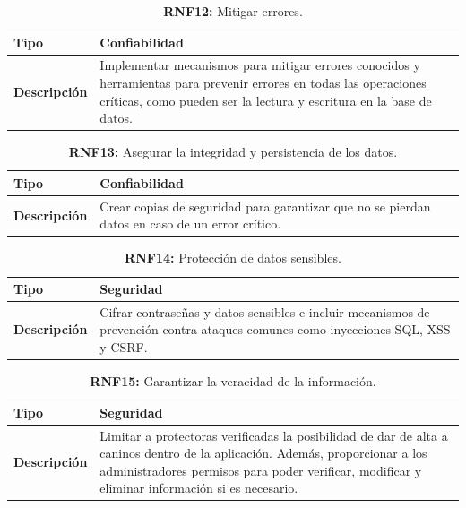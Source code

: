 \documentclass[a4paper, 12pt]{article}
\begin{document}
\begin{table}[H]
\captionsetup{list=no}%
\captionsetup{justification=raggedright,singlelinecheck=false}
\captionsetup{labelformat=empty}
\caption*{\textbf{RNF12:} Mitigar errores.}
\label{tab:RNF12}
    \begin{tabular}{|m{5cm}|m{10cm}|}
	    \hline
	    \textbf{Tipo} & Confiabilidad \\ 
	    \hline
	    \textbf{Descripción} & Implementar mecanismos para mitigar errores conocidos y herramientas para prevenir errores en todas las operaciones críticas, como pueden ser la lectura y escritura en la base de datos. \\ 
	    \hline
    \end{tabular}
\end{table}

\begin{table}[H]
\captionsetup{list=no}%
\captionsetup{justification=raggedright,singlelinecheck=false}
\captionsetup{labelformat=empty}
\caption*{\textbf{RNF13:} Asegurar la integridad y persistencia de los datos.}
\label{tab:RNF13}
    \begin{tabular}{|m{5cm}|m{10cm}|}
	    \hline
	    \textbf{Tipo} & Confiabilidad \\ 
	    \hline
	    \textbf{Descripción} & Crear copias de seguridad para garantizar que no se pierdan datos en caso de un error crítico. \\ 
	    \hline
    \end{tabular}
\end{table}


\begin{table}[H]
\captionsetup{list=no}%
\captionsetup{justification=raggedright,singlelinecheck=false}
\captionsetup{labelformat=empty}
\caption*{\textbf{RNF14:} Protección de datos sensibles.}
\label{tab:RNF14}
    \begin{tabular}{|m{5cm}|m{10cm}|}
	    \hline
	    \textbf{Tipo} & Seguridad \\ 
	    \hline
	    \textbf{Descripción} & Cifrar contraseñas y datos sensibles e incluir mecanismos de prevención contra ataques comunes como inyecciones SQL, XSS y CSRF.\\ 
	    \hline
    \end{tabular}
\end{table}


\begin{table}[H]
\captionsetup{list=no}%
\captionsetup{justification=raggedright,singlelinecheck=false}
\captionsetup{labelformat=empty}
\caption*{\textbf{RNF15:} Garantizar la veracidad de la información.}
\label{tab:RNF15}
    \begin{tabular}{|m{5cm}|m{10cm}|}
	    \hline
	    \textbf{Tipo} & Seguridad \\ 
	    \hline
	    \textbf{Descripción} & Limitar a protectoras verificadas la posibilidad de dar de alta a caninos dentro de la aplicación. Además, proporcionar a los administradores permisos para poder verificar, modificar y eliminar información si es necesario. \\ 
	    \hline
    \end{tabular}
\end{table}
\end{document}
